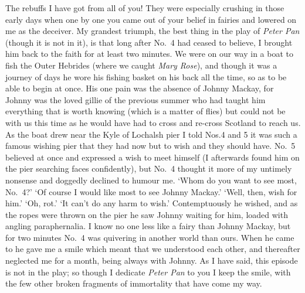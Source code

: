 The rebuffs I have got from all of you!
They were especially crushing in those early days when one by one
you came out of your belief in fairies and lowered on me as the deceiver.
My grandest triumph, the best thing in the play of \emph{Peter Pan}
(though it is not in it),
is that long after No.~4 had ceased to believe,
I brought him back to the faith for at least two minutes.
We were on our way in a boat to fish the Outer Hebrides
(where we caught \emph{Mary Rose}),
and though it was a journey of days he wore his fishing basket on his back all the time,
so as to be able to begin at once.
His one pain was the absence of Johnny Mackay,
for Johnny was the loved gillie of the previous summer
who had taught him everything that is worth knowing
(which is a matter of flies)
but could not be with us this time as he would have had to cross and re-cross Scotland to reach us.
As the boat drew near the Kyle of Lochalsh pier
I told Nos.\@ 4 and 5 it was such a famous wishing pier
that they had now but to wish and they should have.
No.~5 believed at once and expressed a wish to meet himself
(I afterwards found him on the pier searching faces confidently),
but No.~4 thought it more of my untimely nonsense and doggedly declined to humour me.
‘Whom do you want to see most, No.~4?’
‘Of course I would like most to see Johnny Mackay.’
‘Well, then, wish for him.’
‘Oh, rot.’
‘It can’t do any harm to wish.’
Contemptuously he wished,
and as the ropes were thrown on the pier he saw Johnny waiting for him,
loaded with angling paraphernalia.
I know no one less like a fairy than Johnny Mackay,
but for two minutes No.~4 was quivering in another world than ours.
When he came to he gave me a smile which meant that we understood each other,
and thereafter neglected me for a month, being always with Johnny.
As I have said, this episode is not in the play;
so though I dedicate \emph{Peter Pan} to you I keep the smile,
with the few other broken fragments of immortality that have come my way.

\endinput
